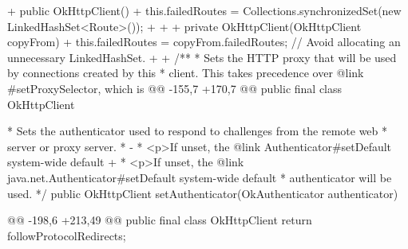 \begin{prompt}
{{+  public OkHttpClient() {
+    this.failedRoutes = Collections.synchronizedSet(new LinkedHashSet<Route>());
+  }
+
+  private OkHttpClient(OkHttpClient copyFrom) {
+    this.failedRoutes = copyFrom.failedRoutes; // Avoid allocating an unnecessary LinkedHashSet.
+  }
+
   /**
    * Sets the HTTP proxy that will be used by connections created by this
    * client. This takes precedence over {@link #setProxySelector}, which is
@@ -155,7 +170,7 @@ public final class OkHttpClient {
    * Sets the authenticator used to respond to challenges from the remote web
    * server or proxy server.
    *
-   * <p>If unset, the {@link Authenticator#setDefault system-wide default}
+   * <p>If unset, the {@link java.net.Authenticator#setDefault system-wide default}
    * authenticator will be used.
    */
   public OkHttpClient setAuthenticator(OkAuthenticator authenticator) {
@@ -198,6 +213,49 @@ public final class OkHttpClient {
     return followProtocolRedirects;
   }

}}}}
\end{prompt}
